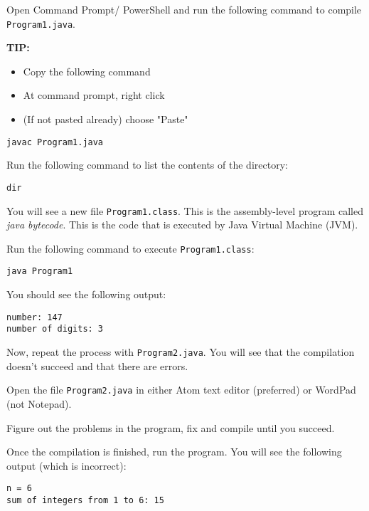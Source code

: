 \begin{questions}
Open Command Prompt/ PowerShell and run the following command to compile \texttt{Program1.java}. 

\textbf{TIP: } 
\newline
\color{blue}
\begin{itemize}
\item Copy the following command 
\item At command prompt, right click
\item (If not pasted already) choose "Paste"
\end{itemize}
\color{black}

\begin{lstlisting}[numbers=none]
javac Program1.java	
\end{lstlisting}

Run the following command to list the contents of the directory:

\begin{lstlisting}[numbers=none]
dir
\end{lstlisting}

You will see a new file \texttt{Program1.class}. This is the assembly-level program called \emph{java bytecode}. This is the code that is executed by Java Virtual Machine (JVM).

Run the following command to execute \texttt{Program1.class}:

\begin{lstlisting}[numbers=none]
java Program1	
\end{lstlisting}

You should see the following output:

\begin{lstlisting}[numbers=none]
number: 147
number of digits: 3
\end{lstlisting}

Now, repeat the process with \texttt{Program2.java}. You will see that the compilation doesn't succeed and that there are errors.

Open the file \texttt{Program2.java} in either Atom text editor (preferred) or WordPad (not Notepad).

Figure out the problems in the program, fix and compile until you succeed.

Once the compilation is finished, run the program. You will see the following output (which is incorrect):

\begin{lstlisting}[numbers=none]
n = 6
sum of integers from 1 to 6: 15	
\end{lstlisting}


\end{questions}
